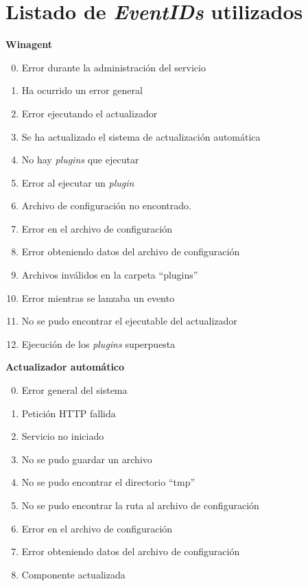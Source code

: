 \chapter{Listado de \textit{EventIDs} utilizados}\label{anx:eventid}
    \textbf{Winagent}
        \begin{enumerate}
            \setcounter{enumi}{-1}
            \item Error durante la administración del servicio
            \item Ha ocurrido un error general
            \item Error ejecutando el actualizador
            \item Se ha actualizado el sistema de actualización automática
            \item No hay \textit{plugins} que ejecutar
            \item Error al ejecutar un \textit{plugin}
            \item Archivo de configuración no encontrado.
            \item Error en el archivo de configuración
            \item Error obteniendo datos del archivo de configuración
            \item Archivos inválidos en la carpeta ``plugins''
            \item Error mientras se lanzaba un evento
            \item No se pudo encontrar el ejecutable del actualizador
            \item Ejecución de los \textit{plugins} superpuesta
        \end{enumerate}{}
        
        \textbf{Actualizador automático}
        \begin{enumerate}
            \setcounter{enumi}{-1}
            \item Error general del sistema
            \item Petición HTTP fallida
            \item Servicio no iniciado
            \item No se pudo guardar un archivo
            \item No se pudo encontrar el directorio ``tmp''
            \item No se pudo encontrar la ruta al archivo de configuración
            \item Error en el archivo de configuración
            \item Error obteniendo datos del archivo de configuración
            \item Componente actualizada
        \end{enumerate}{}
        
